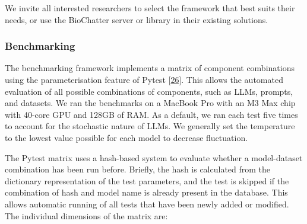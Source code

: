 We invite all interested researchers to select the framework that best suits their needs, or use the BioChatter server or library in their existing solutions.

\hypertarget{benchmarking-1}{%
\subsubsection{Benchmarking}\label{benchmarking-1}}

The benchmarking framework implements a matrix of component combinations using the parameterisation feature of Pytest {[}\protect\hyperlink{ref-14upAJPXR}{26}{]}.
This allows the automated evaluation of all possible combinations of components, such as LLMs, prompts, and datasets.
We ran the benchmarks on a MacBook Pro with an M3 Max chip with 40-core GPU and 128GB of RAM.
As a default, we ran each test five times to account for the stochastic nature of LLMs.
We generally set the temperature to the lowest value possible for each model to decrease fluctuation.

The Pytest matrix uses a hash-based system to evaluate whether a model-dataset combination has been run before.
Briefly, the hash is calculated from the dictionary representation of the test parameters, and the test is skipped if the combination of hash and model name is already present in the database.
This allows automatic running of all tests that have been newly added or modified.
The individual dimensions of the matrix are:

